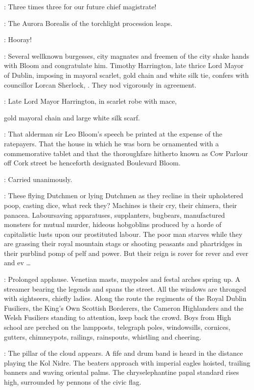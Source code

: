 \Elector:
Three times three for our future chief magistrate!

:
The Aurora Borealis of the torchlight procession leaps.

\Torchbearers:
Hooray!

:
Several wellknown burgesses,
city magnates and freemen of the city
shake hands with Bloom and congratulate him.
Timothy Harrington,
late thrice Lord Mayor of Dublin,
imposing in mayoral scarlet,
gold chain and white silk tie,
confers with councillor Lorcan Sherlock,
.
They nod vigorously in agreement.

:
Late Lord Mayor Harrington,
in scarlet robe with mace,

gold mayoral chain and large white silk scarf.

\Harrington:
That alderman sir Leo Bloom's speech be printed at the expense of the ratepayers.
That the house in which he was born be ornamented with a commemorative tablet
and that the thoroughfare hitherto known as Cow Parlour off Cork street
be henceforth designated Boulevard Bloom.

\Lorcan[2]:
Carried unanimously.

\Bloom:
These flying Dutchmen or lying Dutchmen as they recline
in their upholstered poop,
casting dice,
what reck they?
Machines is their cry,
their chimera,
their panacea.
Laboursaving apparatuses,
supplanters,
bugbears,
manufactured monsters for mutual murder,
hideous hobgoblins produced by
a horde of capitalistic lusts upon our prostituted labour.
The poor man starves while they are grassing their royal mountain stags
or shooting peasants and phartridges in their purblind pomp of pelf and power.
But their reign is rover for rever and ever and ev \ldots

:
Prolonged applause.
Venetian masts,
maypoles and festal arches spring up.
A streamer bearing the legends 
and
spans the street.
All the windows are thronged with sightseers,
chiefly ladies.
Along the route the regiments of the Royal Dublin Fusiliers,
the King's Own Scottish Borderers,
the Cameron Highlanders
and the Welsh Fusiliers standing to attention,
keep back the crowd.
Boys from High school are perched on the lampposts,
telegraph poles,
windowsills,
cornices,
gutters,
chimneypots,
railings,
rainspouts,
whistling and cheering.

:
The pillar of the cloud appears.
A fife and drum band is heard in the distance playing the Kol Nidre.
The beaters approach with imperial eagles hoisted,
trailing banners and waving oriental palms.
The chryselephantine papal standard rises high,
surrounded by pennons of the civic flag.

